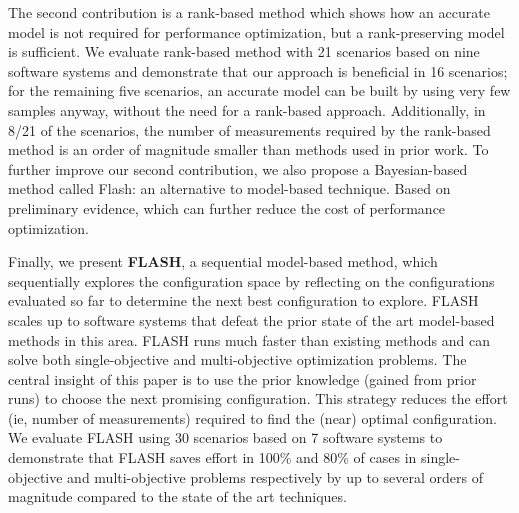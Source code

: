 The second contribution is a rank-based method
which shows how an accurate model is not required for performance optimization, but a rank-preserving model is sufficient. We evaluate rank-based method with 21 scenarios based on nine software systems and demonstrate that our approach is beneficial in 16 scenarios; for the remaining five scenarios, an accurate model
can be built by using very few samples anyway, without the need
for a rank-based approach. Additionally, in 8/21 of the scenarios,
the number of measurements required by the rank-based method
is an order of magnitude smaller than methods used in prior work.
To further improve our second contribution, we also propose a
Bayesian-based method called Flash: an alternative to model-based
technique. Based on preliminary evidence, which can further reduce
the cost of performance optimization. 


Finally, we present \textbf{FLASH},  a sequential model-based method, which sequentially explores the configuration space by reflecting on the configurations evaluated so far to determine the next best configuration to explore. FLASH scales up to software systems that defeat the prior state of the art model-based methods in this area. FLASH runs much faster than existing methods and can solve both single-objective and multi-objective optimization problems. The central insight of this paper is to use the prior knowledge (gained from prior runs) to choose the next promising configuration. This strategy reduces the effort (ie, number of measurements) required to find the (near) optimal configuration. We evaluate FLASH using 30 scenarios based on 7 software systems to demonstrate that FLASH saves effort in 100\% and 80\% of cases in single-objective and multi-objective problems respectively by up to several orders of magnitude compared to the state of the art techniques.
